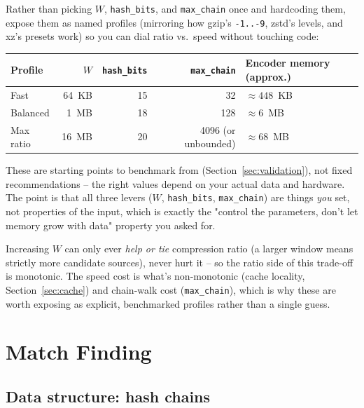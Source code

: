 \documentclass[11pt]{article}
\begin{document}
Rather than picking $W$, \texttt{hash\_bits}, and \texttt{max\_chain} once and hardcoding
them, expose them as named profiles (mirroring how gzip's \texttt{-1..-9}, zstd's
levels, and xz's presets work) so you can dial ratio vs.\ speed without touching code:

\begin{center}
\begin{tabular}{@{}lrrrl@{}}
\toprule
Profile & $W$ & \texttt{hash\_bits} & \texttt{max\_chain} & Encoder memory (approx.) \\
\midrule
Fast & 64~KB & 15 & 32 & $\approx 448$~KB \\
Balanced & 1~MB & 18 & 128 & $\approx 6$~MB \\
Max ratio & 16~MB & 20 & 4096 (or unbounded) & $\approx 68$~MB \\
\bottomrule
\end{tabular}
\end{center}

These are starting points to benchmark from (Section~\ref{sec:validation}), not fixed
recommendations -- the right values depend on your actual data and hardware. The point
is that all three levers ($W$, \texttt{hash\_bits}, \texttt{max\_chain}) are things
\emph{you} set, not properties of the input, which is exactly the "control the
parameters, don't let memory grow with data" property you asked for.

\begin{tcolorbox}[colback=blue!5!white,colframe=blue!50!black,title=Relationship to Section~\ref{sec:calibration}'s "Fast" and "Max ratio" endpoints]
Increasing $W$ can only ever \emph{help or tie} compression ratio (a larger window
means strictly more candidate sources), never hurt it -- so the ratio side of this
trade-off is monotonic. The speed cost is what's non-monotonic (cache locality,
Section~\ref{sec:cache}) and chain-walk cost (\texttt{max\_chain}), which is why these
are worth exposing as explicit, benchmarked profiles rather than a single guess.
\end{tcolorbox}

\section{Match Finding}
\label{sec:matchfinder}

\subsection{Data structure: hash chains}
\end{document}
